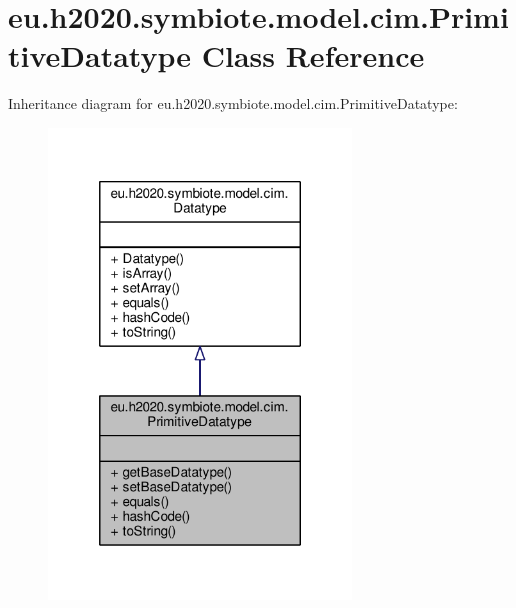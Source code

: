 \hypertarget{classeu_1_1h2020_1_1symbiote_1_1model_1_1cim_1_1PrimitiveDatatype}{}\section{eu.\+h2020.\+symbiote.\+model.\+cim.\+Primitive\+Datatype Class Reference}
\label{classeu_1_1h2020_1_1symbiote_1_1model_1_1cim_1_1PrimitiveDatatype}


Inheritance diagram for eu.\+h2020.\+symbiote.\+model.\+cim.\+Primitive\+Datatype\+:
\nopagebreak
\begin{figure}[H]
\begin{center}
\leavevmode
\includegraphics[width=228pt]{classeu_1_1h2020_1_1symbiote_1_1model_1_1cim_1_1PrimitiveDatatype__inherit__graph}
\end{center}
\end{figure}


